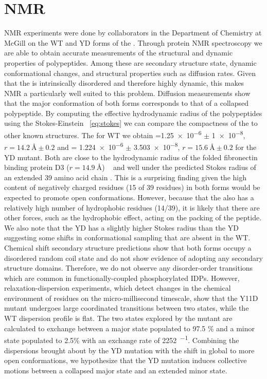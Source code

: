 \section{NMR}

NMR experiments were done by collaborators in the Department of Chemistry at McGill on the WT and YD forms of the \gct. Through protein NMR spectroscopy we are able to obtain accurate \vitro measurements of the structural and dynamic properties of polypeptides. Among these are secondary structure state, dynamic conformational changes, and structural properties such as diffusion rates. Given that the \gct is intrinsically disordered and therefore highly dynamic, this makes NMR a particularly well suited to this problem. Diffusion measurements show that the major conformation of both forms corresponds to that of a collapsed polypeptide. By computing the effective hydrodynamic radius of the polypeptides using the Stokes-Einstein ~\ref{eq:stokes} we can compare the compactness of the \gct to other known structures. The for WT we obtain \diffusion=\num{1.25e-6} $\pm$  \SI{1e-8}{\dcunits}, $r = \SI{14.2}{\angstrom} \pm 0.2$ and \diffusion= \num{1.224e-6} $\pm$ \SI{3.503e-8}{\dcunits}, $r = \SI{15.6}{\angstrom} \pm 0.2$ for the YD mutant. Both are close to the hydrodynamic radius of the folded fibronectin binding protein D3 ($r = \SI{14.9}{\angstrom}$) ~\cite{wilkins1999hydrodynamic} and well under the predicted Stokes radius of an extended 39 amino acid chain . This is a surprising finding given the high content of negatively charged residues (15 of 39 residues) in both forms would be expected to promote open conformations. However, because that the \gct also has a relatively high number of hydrophobic residues (14/39), it is likely that there are other forces, such as the hydrophobic effect, acting on the packing of the peptide. We also note that the YD has a slightly higher Stokes radius than the YD suggesting some shifts in conformational sampling that are absent in the WT. Chemical shift secondary structure predictions show that both forms occupy a disordered random coil state and do not show evidence of adopting any secondary structure domains. Therefore, we do not observe any disorder-order transitions which are common in functionally-coupled phosphorylated IDPs. However, relaxation-dispersion experiments, which detect changes in the chemical environment of residues on the micro-millisecond timescale, show that the Y11D mutant undergoes large coordinated transitions between two states, while the WT dispersion profile is flat. The two states explored by the mutant are calculated to exchange between a major state populated to 97.5 \% and a minor state populated to 2.5\% with an exchange rate of \SI{2252}{\sec^{-1}}. Combining the dispersions brought about by the YD mutation with the shift in global \diffusion to more open conformations, we hypothesize that the YD mutation induces collective motions between a collapsed major state and an extended minor state. 

